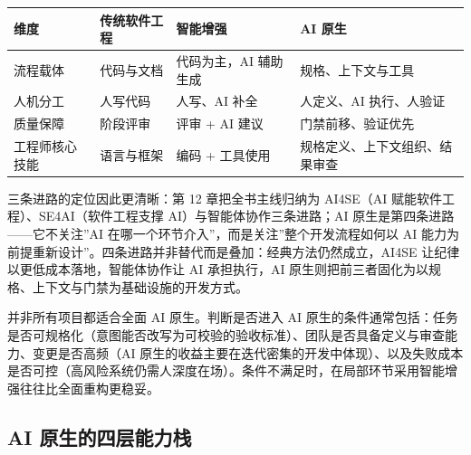 \documentclass[
]{ctexbook}
\newcounter{none}
\begin{document}
{\def\LTcaptype{none} %
\begin{longtable}[]{@{}
  >{\raggedright\arraybackslash}p{}
  >{\raggedright\arraybackslash}p{}
  >{\raggedright\arraybackslash}p{}
  >{\raggedright\arraybackslash}p{}@{}}
\toprule\noalign{}
\begin{minipage}[b]{\linewidth}\raggedright
维度
\end{minipage} & \begin{minipage}[b]{\linewidth}\raggedright
传统软件工程
\end{minipage} & \begin{minipage}[b]{\linewidth}\raggedright
智能增强
\end{minipage} & \begin{minipage}[b]{\linewidth}\raggedright
AI 原生
\end{minipage} \\
\midrule\noalign{}
\endhead
\bottomrule\noalign{}
\endlastfoot
流程载体 & 代码与文档 & 代码为主，AI 辅助生成 & 规格、上下文与工具 \\
人机分工 & 人写代码 & 人写、AI 补全 & 人定义、AI 执行、人验证 \\
质量保障 & 阶段评审 & 评审 + AI 建议 & 门禁前移、验证优先 \\
工程师核心技能 & 语言与框架 & 编码 + 工具使用 &
规格定义、上下文组织、结果审查 \\
\end{longtable}
}

三条进路的定位因此更清晰：第 12 章把全书主线归纳为 AI4SE（AI
赋能软件工程）、SE4AI（软件工程支撑 AI）与智能体协作三条进路；AI
原生是第四条进路------它不关注''AI
在哪一个环节介入''，而是关注''整个开发流程如何以 AI
能力为前提重新设计''。四条进路并非替代而是叠加：经典方法仍然成立，AI4SE
让纪律以更低成本落地，智能体协作让 AI 承担执行，AI
原生则把前三者固化为以规格、上下文与门禁为基础设施的开发方式。

并非所有项目都适合全面 AI 原生。判断是否进入 AI
原生的条件通常包括：任务是否可规格化（意图能否改写为可校验的验收标准）、团队是否具备定义与审查能力、变更是否高频（AI
原生的收益主要在迭代密集的开发中体现）、以及失败成本是否可控（高风险系统仍需人深度在场）。条件不满足时，在局部环节采用智能增强往往比全面重构更稳妥。

\subsection{AI
原生的四层能力栈}\label{ai-ux539fux751fux7684ux56dbux5c42ux80fdux529bux6808}
\end{document}
